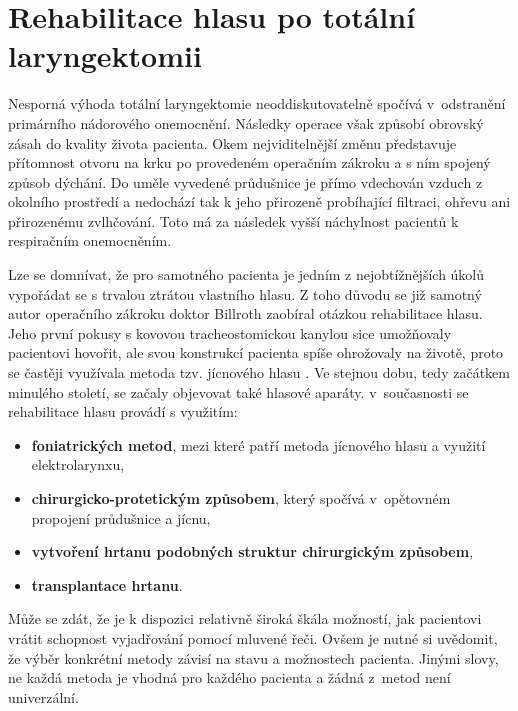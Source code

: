 \section{Rehabilitace hlasu po totální laryngektomii}
\label{chap:cause:treatment}

Nesporná výhoda totální laryngektomie neoddiskutovatelně spočívá v~odstranění
primárního nádorového onemocnění. Následky operace však způsobí obrovský
zásah do kvality života pacienta. Okem nejviditelnější změnu představuje
přítomnost otvoru na krku po provedeném operačním zákroku a s ním spojený způsob dýchání.
Do uměle vyvedené průdušnice je přímo vdechován vzduch z okolního prostředí a nedochází tak k jeho přirozeně probíhající filtraci, ohřevu ani přirozenému zvlhčování. Toto má za následek vyšší náchylnost pacientů k respiračním onemocněním.

Lze se domnívat, že pro samotného pacienta je jedním z nejobtížnějších úkolů vypořádat se s trvalou
ztrátou vlastního hlasu. Z toho důvodu se již samotný autor operačního zákroku doktor
Billroth zaobíral otázkou rehabilitace hlasu. Jeho první pokusy s kovovou
tracheostomickou kanylou sice umožňovaly pacientovi hovořit, ale svou
konstrukcí pacienta spíše ohrožovaly na životě, proto se častěji využívala
metoda tzv. jícnového hlasu \cite{Sebova-Sedenkova2006}. Ve stejnou
dobu, tedy začátkem minulého století, se začaly objevovat také %
hlasové aparáty. v~současnosti se rehabilitace hlasu provádí s využitím: %

\begin{itemize}
  \item \textbf{foniatrických metod}, mezi které patří metoda jícnového hlasu a využití elektrolarynxu,
  \item \textbf{chirurgicko-protetickým způsobem}, který spočívá v~opětovném propojení průdušnice a jícnu,
  \item \textbf{vytvoření hrtanu podobných struktur chirurgickým způsobem},
  \item \textbf{transplantace hrtanu}.
\end{itemize}

\noindent Může se zdát, že je k dispozici relativně široká škála
možností, jak pacientovi vrátit schopnost vyjadřování pomocí mluvené řeči.
Ovšem je nutné si uvědomit, že výběr konkrétní metody závisí na stavu
a možnostech pacienta. Jinými slovy, ne každá metoda je vhodná pro každého pacienta
a žádná z~metod není univerzální.

